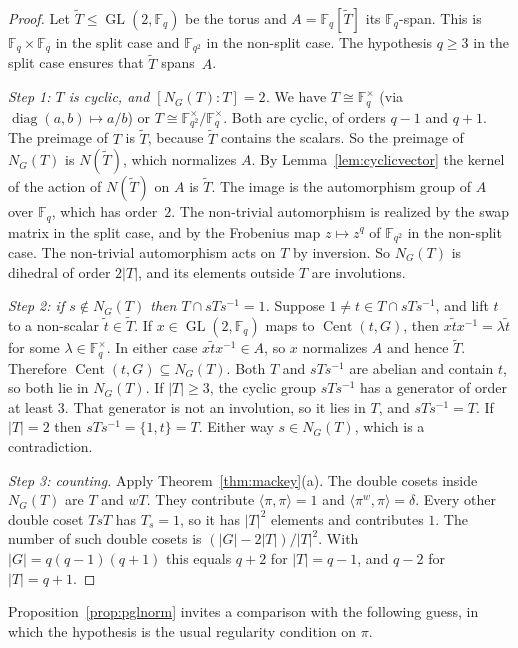 \documentclass[12pt,letterpaper]{article}
\numberwithin{equation}{section}
\theoremstyle{plain}
\theoremstyle{definition}
\newcommand{\F}{\mathbb{F}}
\DeclareMathOperator{\Cent}{Cent}
\DeclareMathOperator{\GL}{GL}
\DeclareMathOperator{\diag}{diag}
\begin{document}
\begin{proof}
Let $\tilde T\le\GL(2,\F_q)$ be the torus and $A=\F_q[\tilde T]$ its
$\F_q$-span. This is $\F_q\times\F_q$ in the split case and $\F_{q^2}$ in
the non-split case. The hypothesis $q\ge3$ in the split case ensures that
$\tilde T$ spans~$A$.

\emph{Step 1: $T$ is cyclic, and $[N_G(T):T]=2$.} We have $T\cong
\F_q^\times$ (via $\diag(a,b)\mapsto a/b$) or $T\cong\F_{q^2}^\times/
\F_q^\times$. Both are cyclic, of orders $q-1$ and $q+1$. The preimage of
$T$ is $\tilde T$, because $\tilde T$ contains the scalars. So the preimage
of $N_G(T)$ is $N(\tilde T)$, which normalizes $A$. By
Lemma~\ref{lem:cyclicvector} the kernel of the action of $N(\tilde T)$ on
$A$ is $\tilde T$. The image is the automorphism group of $A$ over $\F_q$,
which has order~$2$. The non-trivial automorphism is realized by the swap
matrix in the split case, and by the Frobenius map $z\mapsto z^q$ of
$\F_{q^2}$ in the non-split case. The non-trivial
automorphism acts on $T$ by inversion. So $N_G(T)$ is dihedral of order
$2|T|$, and its elements outside $T$ are involutions.

\emph{Step 2: if $s\notin N_G(T)$ then $T\cap sTs^{-1}=1$.} Suppose $1\neq
t\in T\cap sTs^{-1}$, and lift $t$ to a non-scalar $\tilde t\in\tilde T$.
If $x\in\GL(2,\F_q)$ maps to $\Cent(t,G)$, then $x\tilde tx^{-1}=\lambda
\tilde t$ for some $\lambda\in\F_q^\times$. In either case $x\tilde tx^{-1}
\in A$, so $x$ normalizes $A$ and hence $\tilde T$. Therefore $\Cent(t,G)
\subseteq N_G(T)$. Both $T$ and $sTs^{-1}$ are abelian and contain $t$, so
both lie in $N_G(T)$. If $|T|\ge3$, the cyclic group $sTs^{-1}$ has a
generator of order at least $3$. That generator is not an involution, so it
lies in $T$, and $sTs^{-1}=T$. If $|T|=2$ then $sTs^{-1}=\{1,t\}=T$. Either
way $s\in N_G(T)$, which is a contradiction.

\emph{Step 3: counting.} Apply Theorem~\ref{thm:mackey}(a). The double
cosets inside $N_G(T)$ are $T$ and $wT$. They contribute
$\langle\pi,\pi\rangle=1$ and $\langle\pi^w,\pi\rangle=\delta$. Every other
double coset $TsT$ has $T_s=1$, so it has $|T|^2$ elements and contributes
$1$. The number of such double cosets is $(|G|-2|T|)/|T|^2$. With
$|G|=q(q-1)(q+1)$ this equals $q+2$ for $|T|=q-1$, and $q-2$ for $|T|=q+1$.
\end{proof}

Proposition~\ref{prop:pglnorm} invites a comparison with the following
guess, in which the hypothesis is the usual regularity condition on $\pi$.
\end{document}
